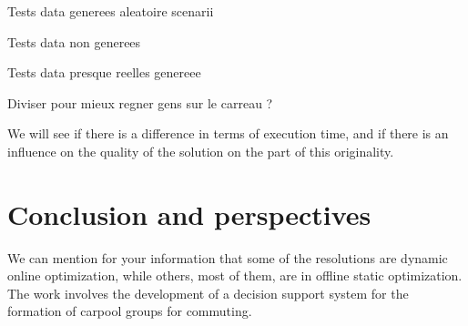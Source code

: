 \documentclass[12pt, a4paper,twoside]{memoir}
\begin{document}
	Tests data generees aleatoire scenarii
	
	Tests data non generees
	
	Tests data presque reelles genereee
	
	Diviser pour mieux regner gens sur le carreau ? 
	
	We will see if there is a difference in terms of execution time, and if there is an influence on the quality of the solution on the part of this originality.

	\cleardoublepage
	\chapter*{Conclusion and perspectives}
	
	We can mention for your information that some of the resolutions are dynamic online optimization, while others, most of them, are in offline static optimization.
	The work involves the development of a decision support system for the formation of carpool groups for commuting.
	
	\backmatter
	\cleardoublepage
	
	
	
	
	\cleardoublepage
	\appendix
\end{document}
